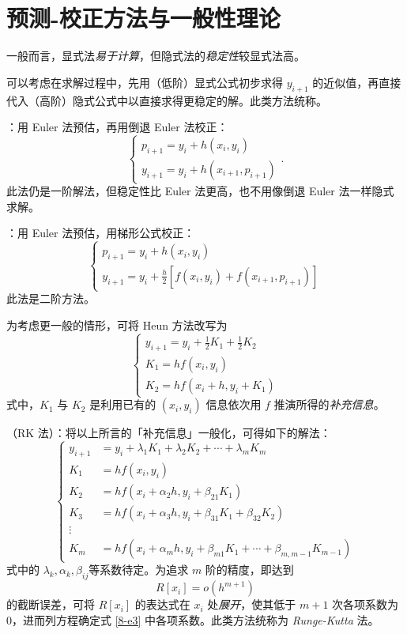 \section{预测-校正方法与一般性理论}
\entry 一般而言，显式法\emph{易于计算}，但隐式法的\emph{稳定性}较显式法高。

\entry 可以考虑在求解过程中，先用（低阶）显式公式初步求得 $y_{i+1}$ 的近似值，再直接代入（高阶）隐式公式中以直接求得更稳定的解。此类方法统称。

\entry {}：用 Euler 法预估，再用倒退 Euler 法校正：
\begin{equation}
\begin{cases}
p_{i+1}=y_i+h(x_i,y_i)\\
y_{i+1}=y_i+h(x_{i+1},p_{i+1})
\end{cases}.
\end{equation}
此法仍是一阶解法，但稳定性比 Euler 法更高，也不用像倒退 Euler 法一样隐式求解。

\entry {}：用 Euler 法预估，用梯形公式校正：
\begin{equation}
\begin{cases}
p_{i+1}=y_i+h(x_i,y_i)\\
y_{i+1}=y_i+\frac h2[f(x_i,y_i)+f(x_{i+1},p_{i+1})]
\end{cases}
\end{equation}
此法是二阶方法。

\entry 为考虑更一般的情形，可将 Heun 方法改写为
\begin{equation}
\begin{cases}
y_{i+1}=y_i+\frac12K_1+\frac12K_2\\
K_1=hf(x_i,y_i)\\
K_2=hf(x_i+h,y_i+K_1)
\end{cases}
\end{equation}
式中，$K_1$ 与 $K_2$ 是利用已有的 $(x_i,y_i)$ 信息依次用 $f$ 推演所得的\emph{补充信息}。

\entry {}（RK 法）：将以上所言的「补充信息」一般化，可得如下的解法：
\begin{equation}\label{8-e3}
\begin{cases}
y_{i+1}&=y_i+\lambda_1K_1+\lambda_2K_2+\cdots+\lambda_mK_m\\
K_1&=hf(x_i,y_i)\\
K_2&=hf(x_i+\alpha_2h,y_i+\beta_{21}K_1)\\
K_3&=hf(x_i+\alpha_3h,y_i+\beta_{31}K_1+\beta_{32}K_2)\\
\vdots&\\
K_m&=hf(x_i+\alpha_mh,y_i+\beta_{m1}K_1+\cdots+\beta_{m,m-1}K_{m-1})
\end{cases}
\end{equation}
式中的 $\lambda_k,\alpha_k,\beta_{ij}$等系数待定。为追求 $m$ 阶的精度，即达到
\begin{equation}
R[x_i]=o(h^{m+1})
\end{equation}
的截断误差，可将 $R[x_i]$ 的表达式在 $x_i$ 处\emph{展开}，使其低于 $m+1$ 次各项系数为 $0$，进而列方程确定式 \eqref{8-e3} 中各项系数。此类方法统称为 \emph{Runge-Kutta} 法。

